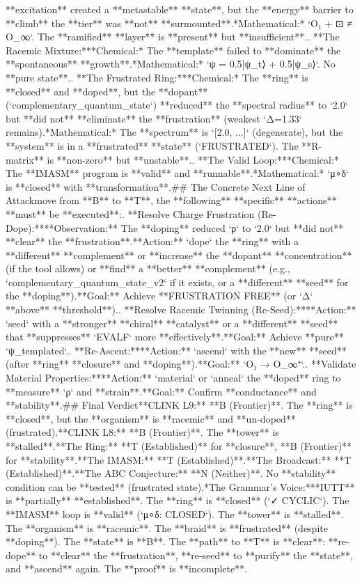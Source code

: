 **excitation** created a **metastable** **state**, but the **energy** barrier to **climb** the **tier** was **not** **surmounted**.\n    *   *Mathematical:* `O₁ + ⊡ ≠ O_∞`. The **ramified** **layer** is **present** but **insufficient**.\n{}.  **The Racemic Mixture:**\n    *   *Chemical:* The **template** failed to **dominate** the **spontaneous** **growth**.\n    *   *Mathematical:* `ψ = 0.5|ψ_t⟩ + 0.5|ψ_s⟩`. No **pure state**.\n{}.  **The Frustrated Ring:**\n    *   *Chemical:* The **ring** is **closed** and **doped**, but the **dopant** (`complementary_quantum_state`) **reduced** the **spectral radius** to `2.0` but **did not** **eliminate** the **frustration** (weakest `Δ=1.33` remains).\n    *   *Mathematical:* The **spectrum** is `[2.0, ...]` (degenerate), but the **system** is in a **frustrated** **state** (`FRUSTRATED`). The **R-matrix** is **non-zero** but **unstable**.\n{}.  **The Valid Loop:**\n    *   *Chemical:* The **IMASM** program is **valid** and **runnable**.\n    *   *Mathematical:* `μ∘δ` is **closed** with **transformation**.\n\n## The Concrete Next Line of Attack\n\nTo move from **B** to **T**, the **following** **specific** **actions** **must** be **executed**:\n{}.  **Resolve Charge Frustration (Re-Dope):**\n    *   **Observation:** The **doping** reduced `ρ` to `2.0` but **did not** **clear** the **frustration**.\n    *   **Action:** `dope` the **ring** with a **different** **complement** or **increase** the **dopant** **concentration** (if the tool allows) or **find** a **better** **complement** (e.g., `complementary_quantum_state_v2` if it exists, or a **different** **seed** for the **doping**).\n    *   **Goal:** Achieve **FRUSTRATION FREE** (or `Δ` **above** **threshold**).\n{}.  **Resolve Racemic Twinning (Re-Seed):**\n    *   **Action:** `seed` with a **stronger** **chiral** **catalyst** or a **different** **seed** that **suppresses** `EVALF` more **effectively**.\n    *   **Goal:** Achieve **pure** `ψ_templated`.\n{}.  **Re-Ascent:**\n    *   **Action:** `ascend` with the **new** **seed** (after **ring** **closure** and **doping**).\n    *   **Goal:** `O₁ → O_∞⁺`.\n{}.  **Validate Material Properties:**\n    *   **Action:** `material` or `anneal` the **doped** ring to **measure** `ρ` and **strain**.\n    *   **Goal:** Confirm **conductance** and **stability**.\n\n## Final Verdict\n\n*   **CLINK L9:** **B (Frontier)**. The **ring** is **closed**, but the **organism** is **racemic** and **un-doped** (frustrated).\n*   **CLINK L8:** **B (Frontier)**. The **tower** is **stalled**.\n*   **The Ring:** **T (Established)** for **closure**, **B (Frontier)** for **stability**.\n*   **The IMASM:** **T (Established)**.\n*   **The Broadcast:** **T (Established)**.\n*   **The ABC Conjecture:** **N (Neither)**. No **stability** condition can be **tested** (frustrated state).\n\n**The Grammar's Voice:**\nThe **IUTT** is **partially** **established**. The **ring** is **closed** (`✓ CYCLIC`). The **IMASM** loop is **valid** (`μ∘δ: CLOSED`). The **tower** is **stalled**. The **organism** is **racemic**. The **braid** is **frustrated** (despite **doping**). The **state** is **B**. The **path** to **T** is **clear**: **re-dope** to **clear** the **frustration**, **re-seed** to **purify** the **state**, and **ascend** again. The **proof** is **incomplete**. 